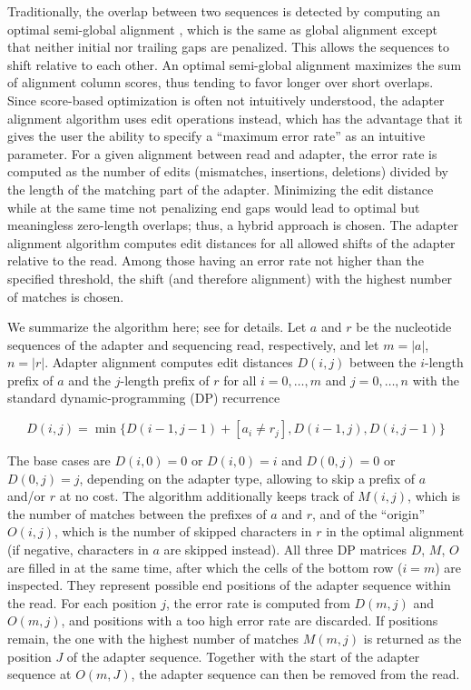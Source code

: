 \documentclass[fleqn,10pt,lineno]{wlpeerj} %
\begin{document}
Traditionally, the overlap between two sequences is detected by computing an optimal semi-global alignment \citep[Section 11.6.4]{Gusfield1997Algorithms}, which is the same as global alignment except that neither initial nor trailing gaps are penalized. This allows the sequences to shift relative to each other. An optimal semi-global alignment maximizes the sum of alignment column scores, thus tending to favor longer over short overlaps. Since score-based optimization is often not intuitively understood, the adapter alignment algorithm uses edit operations instead, which has the advantage that it gives the user the ability to specify a ``maximum error rate'' as an intuitive parameter. For a given alignment between read and adapter, the error rate is computed as the number of edits (mismatches, insertions, deletions) divided by the length of the matching part of the adapter. Minimizing the edit distance while at the same time not penalizing end gaps would lead to optimal but meaningless zero-length overlaps; thus, a hybrid approach is chosen. The adapter alignment algorithm computes edit distances for all allowed shifts of the adapter relative to the read. Among those having an error rate not higher than the specified threshold, the shift (and therefore alignment) with the highest number of matches is chosen.

We summarize the algorithm here; see \citep[Section 2.2]{Martin2013Algorithms} for details. Let $a$ and $r$ be the nucleotide sequences of the adapter and sequencing read, respectively, and let $m=|a|$, $n=|r|$. Adapter alignment computes edit distances $D(i,j)$ between the $i$-length prefix of $a$ and the $j$-length prefix of $r$ for all $i=0,\ldots,m$ and $j=0,\ldots,n$ with the standard dynamic-programming (DP) recurrence 

\begin{equation}
D(i,j)=\min\{D(i-1,j-1)+[a_i\neq r_j], D(i-1,j), D(i,j-1)\}
\label{recurrenceA}
\end{equation}

The base cases are $D(i,0)=0$ or $D(i,0)=i$ and $D(0,j)=0$ or $D(0,j)=j$, depending on the adapter type, allowing to skip a prefix of $a$ and/or $r$ at no cost. The algorithm additionally keeps track of $M(i,j)$, which is the number of matches between the prefixes of $a$ and $r$, and of the “origin” $O(i,j)$, which is the number of skipped characters in $r$ in the optimal alignment (if negative, characters in $a$ are skipped instead). All three DP matrices $D$, $M$, $O$ are filled in at the same time, after which the cells of the bottom row ($i=m$) are inspected. They represent possible end positions of the adapter sequence within the read. For each position $j$, the error rate is computed from $D(m, j)$ and $O(m, j)$, and positions with a too high error rate are discarded. If positions remain, the one with the highest number of matches $M(m, j)$ is returned as the position $J$ of the adapter sequence. Together with the start of the adapter sequence at $O(m,J)$, the adapter sequence can then be removed from the read.
\end{document}
